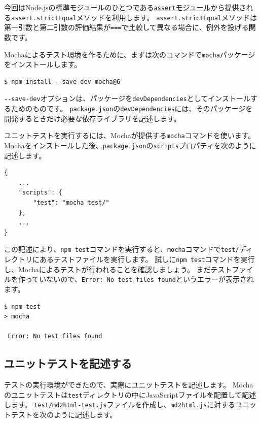 今回はNode.jsの標準モジュールのひとつである\href{https://nodejs.org/api/assert.html}{\texttt{assert}モジュール}から提供される\texttt{assert.strictEqual}メソッドを利用します。
\texttt{assert.strictEqual}メソッドは第一引数と第二引数の評価結果が\texttt{===}で比較して異なる場合に、例外を投げる関数です。

Mochaによるテスト環境を作るために、まずは次のコマンドで\texttt{mocha}パッケージをインストールします。

\begin{lstlisting}
$ npm install --save-dev mocha@6
\end{lstlisting}

\texttt{-\/-save-dev}オプションは、パッケージを\texttt{devDependencies}としてインストールするためのものです。
\texttt{package.json}の\texttt{devDependencies}には、そのパッケージを開発するときだけ必要な依存ライブラリを記述します。

ユニットテストを実行するには、Mochaが提供する\texttt{mocha}コマンドを使います。
Mochaをインストールした後、\texttt{package.json}の\texttt{scripts}プロパティを次のように記述します。

\begin{lstlisting}
{
    ...
    "scripts": {
        "test": "mocha test/"
    },
    ...
}
\end{lstlisting}

この記述により、\texttt{npm test}コマンドを実行すると、\texttt{mocha}コマンドで\texttt{test/}ディレクトリにあるテストファイルを実行します。
試しに\texttt{npm test}コマンドを実行し、Mochaによるテストが行われることを確認しましょう。
まだテストファイルを作っていないので、\texttt{Error: No test files found}というエラーが表示されます。

\begin{lstlisting}
$ npm test
> mocha

 Error: No test files found
\end{lstlisting}

\hypertarget{write-unit-test}{%
\subsection{ユニットテストを記述する}\label{write-unit-test}}

テストの実行環境ができたので、実際にユニットテストを記述します。
Mochaのユニットテストは\texttt{test}ディレクトリの中にJavaScriptファイルを配置して記述します。
\texttt{test/md2html-test.js}ファイルを作成し、\texttt{md2html.js}に対するユニットテストを次のように記述します。

